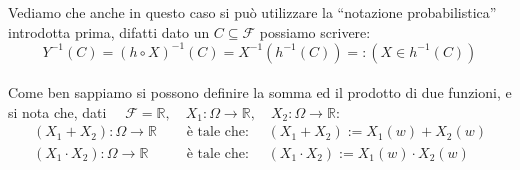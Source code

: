Vediamo che anche in questo caso si può utilizzare la ``notazione probabilistica'' introdotta prima, difatti dato un $C\subseteq \mathcal{F}$ possiamo scrivere:
\[Y^{-1}(C) = (h\circ X)^{-1}(C) = X^{-1}(h^{-1}(C)) =: (X\in h^{-1}(C))\]\\
\noindent Come ben sappiamo si possono definire la somma ed il prodotto di due funzioni, e si nota che, dati $\quad \mathcal{F}=\mathbb{R}, \quad X_1:\Omega\to \mathbb{R}, \quad X_2:\Omega\to\mathbb{R}$:
\begin{align*}
    (X_1+X_2):\Omega\to\mathbb{R}\quad &\text{ è tale che: }\quad(X_1+X_2) := X_1(w) + X_2(w)\\
    (X_1\cdot X_2):\Omega\to\mathbb{R}\quad &\text{ è tale che: }\quad(X_1\cdot X_2) := X_1(w) \cdot X_2(w)
\end{align*}

